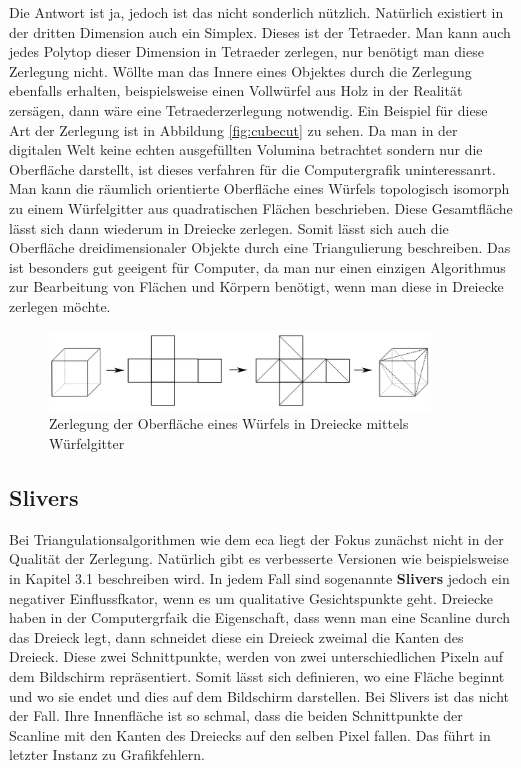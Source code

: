 Die Antwort ist ja, jedoch ist das nicht sonderlich nützlich. Natürlich existiert in der dritten Dimension auch ein Simplex. Dieses ist der Tetraeder. Man kann auch jedes Polytop 
dieser Dimension in Tetraeder zerlegen, nur benötigt man diese Zerlegung nicht. 
Wöllte man das Innere eines Objektes durch die Zerlegung ebenfalls erhalten, beispielsweise einen Vollwürfel aus Holz in der 
Realität zersägen, dann wäre eine Tetraederzerlegung notwendig. Ein Beispiel für diese Art der Zerlegung ist in Abbildung \ref{fig:cubecut} zu sehen. 
Da man in der digitalen Welt keine echten ausgefüllten Volumina betrachtet sondern nur die Oberfläche darstellt, ist dieses verfahren für die 
Computergrafik uninteressanrt. Man kann die räumlich orientierte Oberfläche eines Würfels topologisch isomorph zu einem Würfelgitter aus quadratischen Flächen beschrieben. Diese Gesamtfläche lässt sich dann 
wiederum in Dreiecke zerlegen. Somit lässt sich auch die Oberfläche dreidimensionaler Objekte durch eine Triangulierung beschreiben. Das ist besonders gut geeigent für Computer, da man nur einen einzigen 
Algorithmus zur Bearbeitung von Flächen und Körpern benötigt, wenn man diese in Dreiecke zerlegen möchte.

\begin{figure}[h]
  \centering
  \includegraphics[width=0.9\textwidth]{bilder/3DZerlegung.png}
  \caption[Zerlegung der Oberfläche eines Würfels in Dreiecke mittels Würfelgitter]{\centering Zerlegung der Oberfläche eines Würfels in Dreiecke mittels Würfelgitter}
  \label{fig:cubenet}
\end{figure}

\subsection{Slivers}

Bei Triangulationsalgorithmen wie dem \ac{eca} liegt der Fokus zunächst nicht in der Qualität der Zerlegung. Natürlich gibt es verbesserte Versionen wie beispielsweise in Kapitel 3.1 beschreiben wird.
In jedem Fall sind sogenannte \textbf{Slivers} jedoch ein negativer Einflussfkator, wenn es um qualitative Gesichtspunkte geht. Dreiecke haben in der Computergrfaik die Eigenschaft, dass wenn man eine Scanline 
durch das Dreieck legt, dann schneidet diese ein Dreieck zweimal die Kanten des Dreieck. Diese zwei Schnittpunkte, werden von zwei unterschiedlichen Pixeln auf dem Bildschirm repräsentiert. Somit lässt sich definieren, 
wo eine Fläche beginnt und wo sie endet und dies auf dem Bildschirm darstellen. Bei Slivers ist das nicht der Fall. Ihre Innenfläche ist so schmal,
dass die beiden Schnittpunkte der Scanline mit den Kanten des Dreiecks auf den selben Pixel fallen. \cite{sliverdef} Das führt in letzter Instanz zu Grafikfehlern. 

